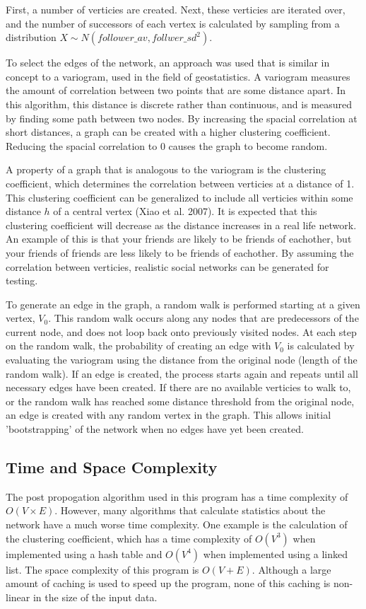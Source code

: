 \documentclass{article}
\begin{document}
First, a number of verticies are created.
Next, these verticies are iterated over, and the number of successors of each
vertex is calculated by sampling from a distribution $X \sim N\left(follower\_av, follwer\_sd^2\right)$.

To select the edges of the network, an approach was used that is similar in concept
to a variogram, used in the field of geostatistics.
A variogram measures the amount of correlation between two points that are some distance apart.
In this algorithm, this distance is discrete rather than continuous, and is measured by finding
some path between two nodes. By increasing the spacial correlation at short distances,
a graph can be created with a higher clustering coefficient. Reducing the spacial correlation
to 0 causes the graph to become random.

A property of a graph that is analogous to the variogram is the clustering
coefficient, which determines the correlation between verticies at a distance of 1.
This clustering coefficient can be generalized to include all verticies
within some distance $h$ of a central vertex (Xiao et al. 2007).
It is expected that this clustering coefficient will decrease as the distance increases
in a real life network. An example of this is that your friends are likely to be friends of
eachother, but your friends of friends are less likely to be friends of eachother.
By assuming the correlation between verticies, realistic social networks can be generated
for testing.

To generate an edge in the graph, a random walk is performed starting at a given vertex, $V_0$.
This random walk occurs along any nodes that are predecessors of the current node,
and does not loop back onto previously visited nodes.
At each step on the random walk, the probability of creating an edge with $V_0$
is calculated by evaluating the variogram using the distance from the original node
(length of the random walk).
If an edge is created, the process
starts again and repeats until all necessary edges have been created.
If there are no available verticies to walk to,
or the random walk has reached some distance threshold from the original node,
an edge is created with any random vertex in the graph. This allows initial
'bootstrapping' of the network when no edges have yet been created.

\subsection{Time and Space Complexity}
The post propogation algorithm used in this program has a time complexity of
$O\left(V \times E\right)$. However, many algorithms that calculate statistics about the network have a much
worse time complexity. One example is the calculation of the clustering coefficient,
which has a time complexity of $O\left(V^3\right)$ when implemented using a hash table
and $O\left(V^4\right)$ when implemented using a linked list.
The space complexity of this program is $O\left(V + E\right)$. Although
a large amount of caching is used to speed up the program, none of this caching
is non-linear in the size of the input data.
\end{document}
